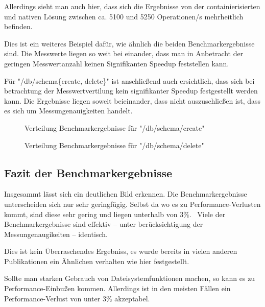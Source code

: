Allerdings sieht man auch hier, dass sich die Ergebnisse von der containierisierten und nativen Lösung zwischen ca. 5100 und 5250 Operationen/s mehrheitlich befinden. 

Dies ist ein weiteres Beispiel dafür, wie ähnlich die beiden Benchmarkergebnisse sind. Die Messwerte liegen so weit bei einander, dass man in Anbetracht der geringen Messwertanzahl keinen Signifikanten Speedup feststellen kann.


Für "/db/schema\{create, delete\}" ist anschließend auch ersichtlich, dass sich bei betrachtung der Messwertvertilung kein signifikanter Speedup festgestellt werden kann. Die Ergebnisse liegen soweit beieinander, dass nicht auszuschließen ist, dass es sich um Messungenauigkeiten handelt.

\begin{figure}
    \centering
    
    \caption{Verteilung Benchmarkergebnisse für "/db/schema/create"}
    \label{fig:mdist_db_schema_create}
\end{figure}

\begin{figure}
    \centering
    
    \caption{Verteilung Benchmarkergebnisse für "/db/schema/delete"}
    \label{fig:mdist_db_schema_delete}
\end{figure}

\FloatBarrier

\subsection{Fazit der Benchmarkergebnisse}

Insgesammt lässt sich ein deutlichen Bild erkennen. Die Benchmarkergebnisse unterscheiden sich nur sehr geringfügig. Selbst da wo es zu Performance-Verlusten kommt, sind diese sehr gering und liegen unterhalb von $3\%$. \
Viele der Benchmarkergebnisse sind effektiv – unter berücksichtigung der Messungenaugikeiten – identisch.

Dies ist kein Überraschendes Ergebniss, es wurde bereits in vielen anderen Publikationen ein Ähnlichen verhalten wie hier festgestellt.  

Sollte man starken Gebrauch von Dateisystemfunktionen machen, so kann es zu Performance-Einbußen kommen. Allerdings ist in den meisten Fällen ein Performance-Verlust von unter $3\%$ akzeptabel. 